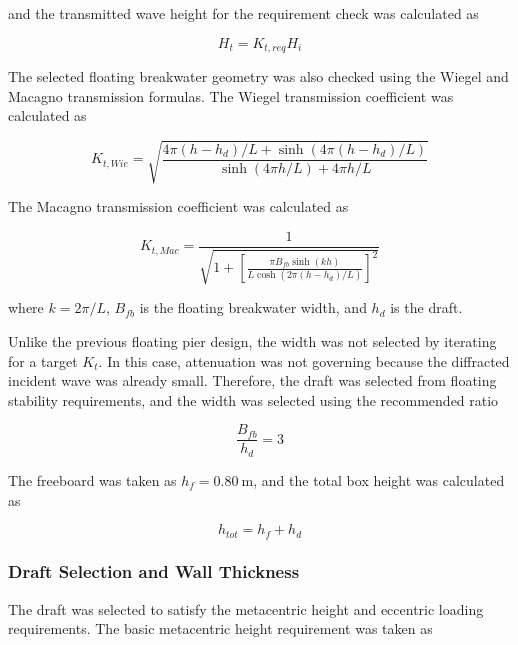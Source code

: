 \documentclass[a4paper, 11pt]{article}
\begin{document}
and the transmitted wave height for the requirement check was calculated as

\begin{equation}
    H_t=K_{t,req}H_i
\end{equation}

The selected floating breakwater geometry was also checked using the Wiegel and Macagno transmission formulas. The Wiegel transmission coefficient was calculated as

\begin{equation}
    K_{t,Wie}=
    \sqrt{
    \frac{
    4\pi(h-h_d)/L+\sinh\left(4\pi(h-h_d)/L\right)
    }
    {
    \sinh(4\pi h/L)+4\pi h/L
    }}
\end{equation}

The Macagno transmission coefficient was calculated as

\begin{equation}
    K_{t,Mac}=
    \frac{1}
    {
    \sqrt{
    1+
    \left[
    \frac{\pi B_{fb}\sinh(kh)}
    {L\cosh\left(2\pi(h-h_d)/L\right)}
    \right]^2
    }}
\end{equation}

where \(k=2\pi/L\), \(B_{fb}\) is the floating breakwater width, and \(h_d\) is the draft.

Unlike the previous floating pier design, the width was not selected by iterating for a target \(K_t\). In this case, attenuation was not governing because the diffracted incident wave was already small. Therefore, the draft was selected from floating stability requirements, and the width was selected using the recommended ratio

\begin{equation}
    \frac{B_{fb}}{h_d}=3
\end{equation}

The freeboard was taken as \(h_f=0.80~\mathrm{m}\), and the total box height was calculated as

\begin{equation}
    h_{tot}=h_f+h_d
\end{equation}

\subsubsection{Draft Selection and Wall Thickness}

\hspace*{0.5cm} The draft was selected to satisfy the metacentric height and eccentric loading requirements. The basic metacentric height requirement was taken as
\end{document}
